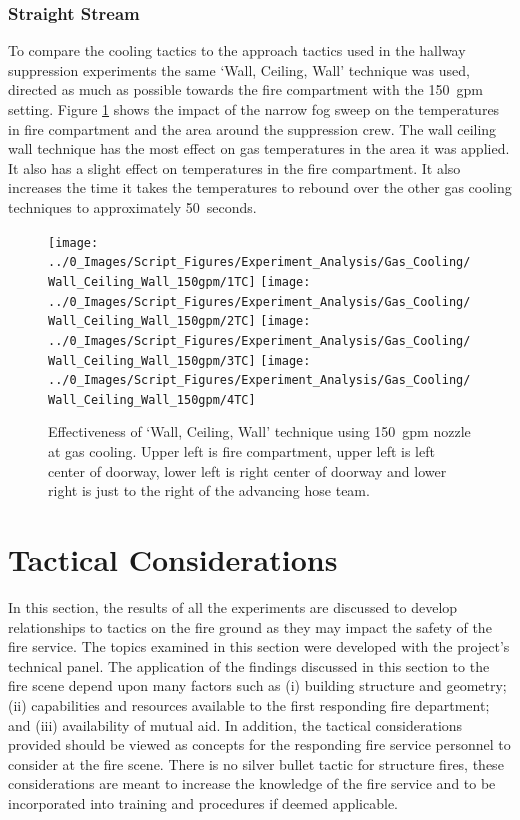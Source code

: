\documentclass[12pt,oneside]{book}
\begin{document}
\subsection{Straight Stream}
To compare the cooling tactics to the approach tactics used in the hallway suppression experiments the same `Wall, Ceiling, Wall' technique was used, directed as much as possible towards the fire compartment with the 150~gpm setting. Figure  \ref{fig:gas_wall_ceiling_wall_150} shows the impact of the narrow fog sweep on the temperatures in fire compartment and the area around the suppression crew. The wall ceiling wall technique has the most effect on gas temperatures in the area it was applied. It also has a slight effect on temperatures in the fire compartment. It also increases the time it takes the temperatures to rebound over the other gas cooling techniques to approximately 50~seconds.

\begin{figure}[H]
\centering
\texttt{[image: ../0\_Images/Script\_Figures/Experiment\_Analysis/Gas\_Cooling/Wall\_Ceiling\_Wall\_150gpm/1TC]}
\texttt{[image: ../0\_Images/Script\_Figures/Experiment\_Analysis/Gas\_Cooling/Wall\_Ceiling\_Wall\_150gpm/2TC]}
\texttt{[image: ../0\_Images/Script\_Figures/Experiment\_Analysis/Gas\_Cooling/Wall\_Ceiling\_Wall\_150gpm/3TC]}
\texttt{[image: ../0\_Images/Script\_Figures/Experiment\_Analysis/Gas\_Cooling/Wall\_Ceiling\_Wall\_150gpm/4TC]}
\caption[Gas Cooling - Straight Stream 150~gpm]{Effectiveness of `Wall, Ceiling, Wall' technique using 150~gpm nozzle at gas cooling. Upper left is fire compartment, upper left is left center of doorway, lower left is right center of doorway and lower right is just to the right of the advancing hose team.}
\label{fig:gas_wall_ceiling_wall_150}
\end{figure}

\clearpage

\chapter{Tactical Considerations}

In this section, the results of all the experiments are discussed to develop relationships to tactics on the fire ground as they may impact the safety of the fire service. The topics examined in this section were developed with the project's technical panel. The application of the findings discussed in this section to the fire scene depend upon many factors such as (i) building structure and geometry; (ii) capabilities and resources available to the first responding fire department; and (iii) availability of mutual aid. In addition, the tactical considerations provided should be viewed as concepts for the responding fire service personnel to consider at the fire scene. There is no silver bullet tactic for structure fires, these considerations are meant to increase the knowledge of the fire service and to be incorporated into training and procedures if deemed applicable. 
\end{document}
